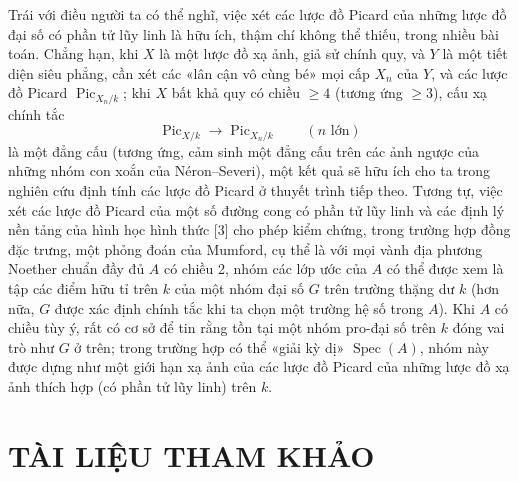  Trái với điều người ta có thể nghĩ, việc xét các lược đồ
Picard của những lược đồ đại số có phần tử lũy linh là hữu ích, thậm chí không
thể thiếu, trong nhiều bài toán. Chẳng hạn, khi $X$ là một lược đồ xạ ảnh, giả
sử chính quy, và $Y$ là một tiết diện siêu phẳng, cần xét các «lân cận vô cùng
bé» mọi cấp $X_n$ của $Y$, và các lược đồ Picard
$\operatorname{Pic}_{X_n/k}$; khi $X$ bất khả quy có chiều $\geq4$ (tương ứng
$\geq3$), cấu xạ chính tắc
\[
\operatorname{Pic}_{X/k}\longrightarrow\operatorname{Pic}_{X_n/k}
\qquad(n\text{ lớn})
\]
là một đẳng cấu (tương ứng, cảm sinh một đẳng cấu trên các ảnh ngược của những
nhóm con xoắn của Néron--Severi), một kết quả sẽ hữu ích cho ta trong nghiên
cứu định tính các lược đồ Picard ở thuyết trình tiếp theo. Tương tự, việc xét
các lược đồ Picard của một số đường cong có phần tử lũy linh và các định lý nền
tảng của hình học hình thức [3] cho phép kiểm chứng, trong trường hợp đồng đặc
trưng, một phỏng đoán của Mumford, cụ thể là với mọi vành địa phương Noether
chuẩn đầy đủ $A$ có chiều 2, nhóm các lớp ước của $A$ có thể được xem là tập
các điểm hữu tỉ trên $k$ của một
nhóm đại số $G$ trên trường thặng dư $k$ (hơn nữa, $G$ được xác định chính tắc
khi ta chọn một trường hệ số trong $A$). Khi $A$ có chiều tùy ý, rất có cơ sở
để tin rằng tồn tại một nhóm pro-đại số trên $k$ đóng vai trò như $G$ ở trên;
trong trường hợp có thể «giải kỳ dị» $\operatorname{Spec}(A)$, nhóm này được
dựng như một giới hạn xạ ảnh của các lược đồ Picard của những lược đồ xạ ảnh
thích hợp (có phần tử lũy linh) trên $k$.

\section*{TÀI LIỆU THAM KHẢO}

